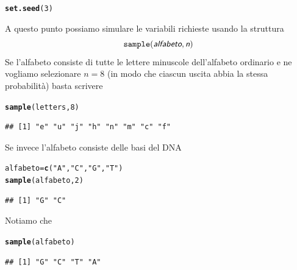 \documentclass[onecolumn,12pt]{book}\usepackage[]{graphicx}\usepackage[]{color}
\makeatletter
\newcommand{\hlnum}[1]{\textcolor[rgb]{0.686,0.059,0.569}{#1}}%
\newcommand{\hlstr}[1]{\textcolor[rgb]{0.192,0.494,0.8}{#1}}%
\newcommand{\hlstd}[1]{\textcolor[rgb]{0.345,0.345,0.345}{#1}}%
\newcommand{\hlkwb}[1]{\textcolor[rgb]{0.69,0.353,0.396}{#1}}%
\newcommand{\hlkwd}[1]{\textcolor[rgb]{0.737,0.353,0.396}{\textbf{#1}}}%
\newenvironment{kframe}{%
 \def\at@end@of@kframe{}%
 \ifinner\ifhmode%
  \def\at@end@of@kframe{\end{minipage}}%
  \begin{minipage}{\columnwidth}%
 \fi\fi%
 \def\FrameCommand##1{\hskip\@totalleftmargin \hskip-\fboxsep
 \colorbox{shadecolor}{##1}\hskip-\fboxsep
     \hskip-\linewidth \hskip-\@totalleftmargin \hskip\columnwidth}%
 \MakeFramed {\advance\hsize-\width
   \@totalleftmargin\z@ \linewidth\hsize
   \@setminipage}}%
 {\par\unskip\endMakeFramed%
 \at@end@of@kframe}
\newenvironment{knitrout}{}{} %
\newcommand{\varia}[1]{\textsl{\textsf{#1}}}
\makeatother
\begin{document}
\begin{knitrout}
\color{fgcolor}\begin{kframe}
\begin{alltt}
\hlkwd{set.seed}\hlstd{(}\hlnum{3}\hlstd{)}
\end{alltt}
\end{kframe}
\end{knitrout}
 
A questo punto possiamo simulare le variabili richieste usando la struttura
\begin{equation}\texttt{sample}(\varia{alfabeto},\varia{n})\end{equation}
Se l'alfabeto consiste di tutte le lettere minuscole dell'alfabeto ordinario e ne vogliamo selezionare $n=8$  (in modo che ciascun uscita abbia la stessa probabilit\`a)  basta scrivere
\begin{knitrout}
\color{fgcolor}\begin{kframe}
\begin{alltt}
\hlkwd{sample}\hlstd{(letters,}\hlnum{8}\hlstd{)}
\end{alltt}
\begin{verbatim}
## [1] "e" "u" "j" "h" "n" "m" "c" "f"
\end{verbatim}
\end{kframe}
\end{knitrout}
Se invece l'alfabeto consiste delle basi del DNA
\begin{knitrout}
\color{fgcolor}\begin{kframe}
\begin{alltt}
\hlstd{alfabeto}\hlkwb{=}\hlkwd{c}\hlstd{(}\hlstr{"A"}\hlstd{,}\hlstr{"C"}\hlstd{,}\hlstr{"G"}\hlstd{,}\hlstr{"T"}\hlstd{)}
\hlkwd{sample}\hlstd{(alfabeto,}\hlnum{2}\hlstd{)}
\end{alltt}
\begin{verbatim}
## [1] "G" "C"
\end{verbatim}
\end{kframe}
\end{knitrout}
Notiamo che
\begin{knitrout}
\color{fgcolor}\begin{kframe}
\begin{alltt}
 \hlkwd{sample}\hlstd{(alfabeto)}
\end{alltt}
\begin{verbatim}
## [1] "G" "C" "T" "A"
\end{verbatim}
\end{kframe}
\end{knitrout}
\end{document}
